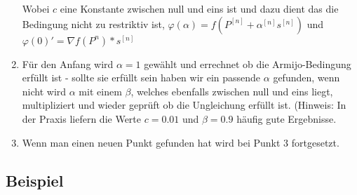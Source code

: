 \documentclass[a4paper, 11pt]{article}
\begin{document}
\begin{enumerate}
      Wobei $c$ eine Konstante zwischen null und eins ist und dazu dient das die Bedingung nicht zu restriktiv ist, $\varphi(\alpha) = f(P^{[n]} + \alpha^{[n]}s^{[n]})$ und $\varphi(0)' = {\nabla}f(P^{n}) * s^{[n]}$
      \item
      Für den Anfang wird $\alpha=1$ gewählt und errechnet ob die Armijo-Bedingung erfüllt ist - sollte sie erfüllt sein haben wir ein passende $\alpha$ gefunden, wenn nicht wird $\alpha$ mit einem $\beta$, welches ebenfalls zwischen null und eins liegt, multipliziert und wieder geprüft ob die Ungleichung erfüllt ist. (Hinweis: In der Praxis liefern die Werte $c = 0.01$ und $\beta = 0.9$ häufig gute Ergebnisse.
      \item
      Wenn man einen neuen Punkt gefunden hat wird bei Punkt 3 fortgesetzt.
      
      
\end{enumerate}

\subsection{Beispiel}
\end{document}
